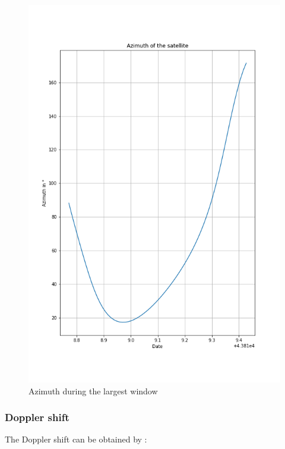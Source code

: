 \documentclass[a4paper,12pt,calibri,oneside,openany]{book}
\theoremstyle{break}
\begin{document}
\begin{figure}[H]
	\centering
	\includegraphics[width=0.7\linewidth]{windowaz}
	\caption{Azimuth during the largest window}
\end{figure}
\subsubsection{Doppler shift}
The Doppler shift can be obtained by :
\end{document}
